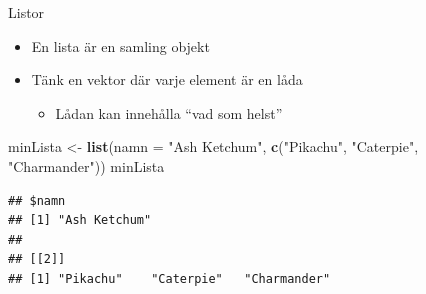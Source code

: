 \documentclass[
  11pt,
  ignorenonframetext,
]{beamer}
\newenvironment{Shaded}{\begin{snugshade}}{\end{snugshade}}
\newcommand{\DataTypeTok}[1]{\textcolor[rgb]{0.13,0.29,0.53}{#1}}
\newcommand{\KeywordTok}[1]{\textcolor[rgb]{0.13,0.29,0.53}{\textbf{#1}}}
\newcommand{\NormalTok}[1]{#1}
\newcommand{\StringTok}[1]{\textcolor[rgb]{0.31,0.60,0.02}{#1}}
\providecommand{\tightlist}{%
  \setlength{\itemsep}{0pt}\setlength{\parskip}{0pt}}
\begin{document}
\begin{frame}[fragile]{Listor}
\protect\hypertarget{listor-1}{}
\begin{itemize}
\tightlist
\item
  En lista är en samling objekt
\item
  Tänk en vektor där varje element är en låda

  \begin{itemize}
  \tightlist
  \item
    Lådan kan innehålla ``vad som helst''
  \end{itemize}
\end{itemize}

\begin{Shaded}
\begin{Highlighting}[]
\NormalTok{minLista \textless{}{-}}\StringTok{ }\KeywordTok{list}\NormalTok{(}\DataTypeTok{namn =} \StringTok{"Ash Ketchum"}\NormalTok{,}
             \KeywordTok{c}\NormalTok{(}\StringTok{"Pikachu"}\NormalTok{, }\StringTok{"Caterpie"}\NormalTok{, }\StringTok{"Charmander"}\NormalTok{))}
\NormalTok{minLista}
\end{Highlighting}
\end{Shaded}

\begin{verbatim}
## $namn
## [1] "Ash Ketchum"
## 
## [[2]]
## [1] "Pikachu"    "Caterpie"   "Charmander"
\end{verbatim}
\end{frame}

\end{document}
